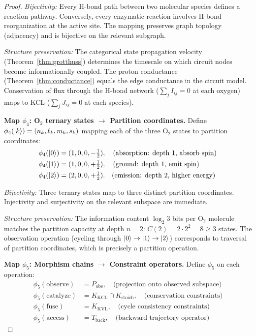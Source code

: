 \documentclass[twocolumn,10pt,a4paper]{article}
\theoremstyle{definition}
\theoremstyle{remark}
\begin{document}
\begin{proof}
\emph{Bijectivity:} Every H-bond path between two molecular species defines a reaction pathway. Conversely, every enzymatic reaction involves H-bond reorganization at the active site. The mapping preserves graph topology (adjacency) and is bijective on the relevant subgraph.

\emph{Structure preservation:} The categorical state propagation velocity (Theorem~\ref{thm:grotthuss}) determines the timescale on which circuit nodes become informationally coupled. The proton conductance (Theorem~\ref{thm:conductance}) equals the edge conductance in the circuit model. Conservation of flux through the H-bond network ($\sum_j I_{ij} = 0$ at each oxygen) maps to KCL ($\sum_j J_{ij} = 0$ at each species).

\textbf{Map $\phi_4$: O$_2$ ternary states $\to$ Partition coordinates.}
Define $\phi_4(\ket{k}) = (n_k, \ell_k, m_k, s_k)$ mapping each of the three O$_2$ states to partition coordinates:
\begin{align}
    \phi_4(\ket{0}) &= (1, 0, 0, -\tfrac{1}{2}), \quad \text{(absorption: depth 1, absorb spin)} \\
    \phi_4(\ket{1}) &= (1, 0, 0, +\tfrac{1}{2}), \quad \text{(ground: depth 1, emit spin)} \\
    \phi_4(\ket{2}) &= (2, 0, 0, +\tfrac{1}{2}). \quad \text{(emission: depth 2, higher energy)}
\end{align}

\emph{Bijectivity:} Three ternary states map to three distinct partition coordinates. Injectivity and surjectivity on the relevant subspace are immediate.

\emph{Structure preservation:} The information content $\log_2 3$ bits per O$_2$ molecule matches the partition capacity at depth $n=2$: $C(2) = 2 \cdot 2^2 = 8 \geq 3$ states. The observation operation (cycling through $\ket{0} \to \ket{1} \to \ket{2}$) corresponds to traversal of partition coordinates, which is precisely a partition operation.

\textbf{Map $\phi_5$: Morphism chains $\to$ Constraint operators.}
Define $\phi_5$ on each operation:
\begin{align}
    \phi_5(\mathrm{observe}) &= P_{\mathrm{obs}}, \quad \text{(projection onto observed subspace)} \\
    \phi_5(\mathrm{catalyze}) &= K_{\mathrm{KCL}} \cap K_{\mathrm{stoich}}, \quad \text{(conservation constraints)} \\
    \phi_5(\mathrm{fuse}) &= K_{\mathrm{KVL}}, \quad \text{(cycle consistency constraints)} \\
    \phi_5(\mathrm{access}) &= T_{\mathrm{back}}, \quad \text{(backward trajectory operator)}
\end{align}


\end{proof}
\end{document}

